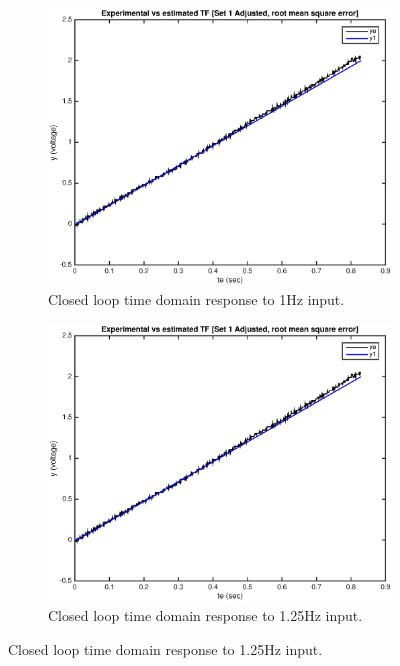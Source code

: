 \documentclass[11pt,a4paper]{article}
\begin{document}
\begin{enumerate}
\begin{figure}[H]
	  \begin{subfigure}{0.5\textwidth}
	  \includegraphics[width=0.9\linewidth]{Matlab_Figures/y2_dataset1_rms.eps}
	  \caption{Closed loop time domain response to 1Hz input.}
	  \label{fig:subim2}
	  \end{subfigure}
	  \begin{subfigure}{0.5\textwidth}
	  \includegraphics[width=0.9\linewidth]{Matlab_Figures/y2_dataset1_rms.eps}
	  \caption{Closed loop time domain response to 1.25Hz input.}
	  \label{fig:subim2}
	  \end{subfigure}
	  

\end{figure}
\end{enumerate}
\end{document}
